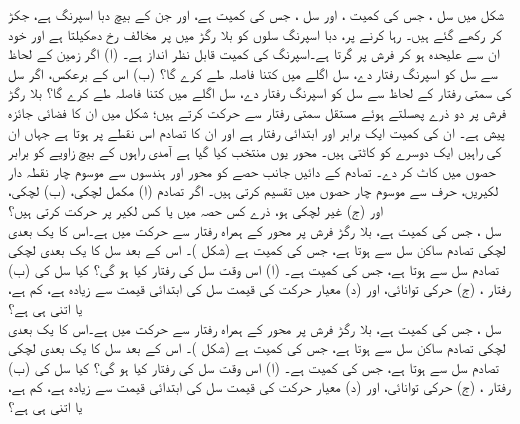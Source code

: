  شکل  میں سل  ، جس  کی کمیت  ،  اور سل  ، جس کی کمیت
  ہے، اور جن    کے بیچ دبا اسپرنگ   ہے،    جکڑ کر رکھے گئے ہیں۔ رہا کرنے پر، دبا اسپرنگ سلوں کو بلا رگڑ میں پر مخالف رخ دھکیلتا ہے اور خود ان سے علیحدہ ہو کر فرش پر گرتا ہے۔اسپرنگ کی کمیت قابل نظر انداز ہے۔ (ا)  اگر   زمین کے لحاظ سے سل  کو اسپرنگ  رفتار دے، سل  اگلے  میں کتنا فاصلہ طے کرے گا؟ (ب) اس کے برعکس، اگر      سل   کی سمتی رفتار کے لحاظ سے سل  کو اسپرنگ  رفتار دے، سل  اگلے  میں کتنا فاصلہ طے کرے گا؟
بلا رگڑ فرش پر دو ذرے پھسلتے ہوئے مستقل سمتی رفتار سے  حرکت کرتے ہیں؛ شکل  میں ان کا   فضائی جائزہ پیش  ہے۔ ان  کی کمیت  ایک برابر اور ابتدائی   رفتار   ہے اور ان کا تصادم اس نقطے پر ہوتا ہے جہاں ان کی راہیں ایک دوسرے کو کاٹتی ہیں۔ محور  یوں منتخب کیا گیا ہے  آمدی راہوں کے بیچ زاویے کو  برابر حصوں میں کاٹ کر   دے۔ تصادم کے  دائیں جانب حصے کو محور  اور ہندسوں سے موسوم  چار نقطہ دار لکیریں، حرف سے موسوم چار   حصوں    میں تقسیم کرتی ہیں۔ اگر تصادم (ا) مکمل لچکی، (ب) لچکی، اور  (ج) غیر لچکی ہو، ذرے کس حصہ میں یا کس لکیر پر  حرکت کرتی  ہیں؟
\\
سل   ،  جس کی کمیت   ہے، بلا رگڑ فرش پر محور   کے ہمراہ   رفتار سے حرکت میں ہے۔اس کا  یک بعدی  لچکی تصادم ساکن سل  سے ہوتا ہے، جس کی کمیت  ہے (شکل )۔ اس کے بعد سل  کا  یک بعدی لچکی تصادم سل  سے ہوتا ہے، جس کی کمیت  ہے۔ (ا) اس وقت سل   کی رفتار کیا ہو گی؟ کیا سل  کی (ب) رفتار ، (ج)   حرکی توانائی، اور (د) معیار حرکت کی قیمت   سل کی ابتدائی قیمت سے زیادہ ہے، کم ہے، یا اتنی ہی ہے؟
\\
سل   ،  جس کی کمیت   ہے، بلا رگڑ فرش پر محور  کے ہمراہ  رفتار سے حرکت میں ہے۔اس کا  یک بعدی  لچکی تصادم ساکن سل  سے ہوتا ہے، جس کی کمیت  ہے (شکل )۔ اس کے بعد سل  کا  یک بعدی لچکی تصادم سل  سے ہوتا ہے، جس کی کمیت  ہے۔ (ا) اس وقت سل   کی رفتار کیا ہو گی؟ کیا سل  کی (ب) رفتار ، (ج)   حرکی توانائی، اور (د) معیار حرکت کی قیمت سل کی ابتدائی قیمت سے زیادہ ہے، کم ہے، یا اتنی ہی ہے؟
